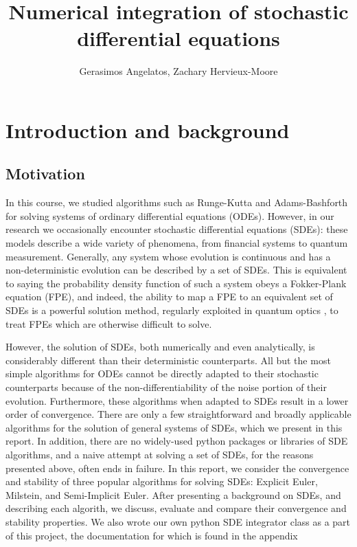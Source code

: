\documentclass[notitlepage,pra,10pt,aps]{revtex4-2}
\begin{document}
\title{Numerical integration of stochastic differential equations}
\author{Gerasimos Angelatos, Zachary Hervieux-Moore}
\affiliation{}
\maketitle
\tableofcontents
{}

\section{Introduction and background}

\subsection{Motivation}
In this course, we studied algorithms such as Runge-Kutta and Adams-Bashforth for solving systems of ordinary differential equations (ODEs).  However, in our research we occasionally encounter stochastic differential equations (SDEs): these models describe a wide variety of phenomena, from financial systems to quantum measurement.  Generally, any system whose evolution is continuous and has a non-deterministic evolution can be described by a set of SDEs.  This is equivalent to saying the probability density function of such a system obeys a Fokker-Plank equation (FPE), and indeed, the ability to map a FPE to an equivalent set of SDEs is a powerful solution method, regularly exploited in quantum optics \cite{Carmichael1999}, to treat FPEs which are otherwise difficult to solve.

However, the solution of SDEs, both numerically and even analytically, is considerably different than their deterministic counterparts.  All but the most simple algorithms for ODEs cannot be directly adapted to their stochastic counterparts because of the non-differentiability of the noise portion of their evolution.  Furthermore, these algorithms when adapted to SDEs result in a lower order of convergence.
There are only a few straightforward and broadly applicable algorithms for the solution of general systems of SDEs, which we present in this report. In addition, there are no widely-used python packages or libraries of SDE algorithms, and a naive attempt at solving a set of SDEs, for the reasons presented above, often ends in failure.  In this report, we consider the convergence and stability of three popular algorithms for solving SDEs:  Explicit Euler, Milstein, and Semi-Implicit Euler.  After presenting a background on SDEs, and describing each algorith, we discuss, evaluate and compare their convergence and stability properties.  We also wrote our own python SDE integrator class as a part of this project, the documentation for which is found in the appendix
\end{document}
